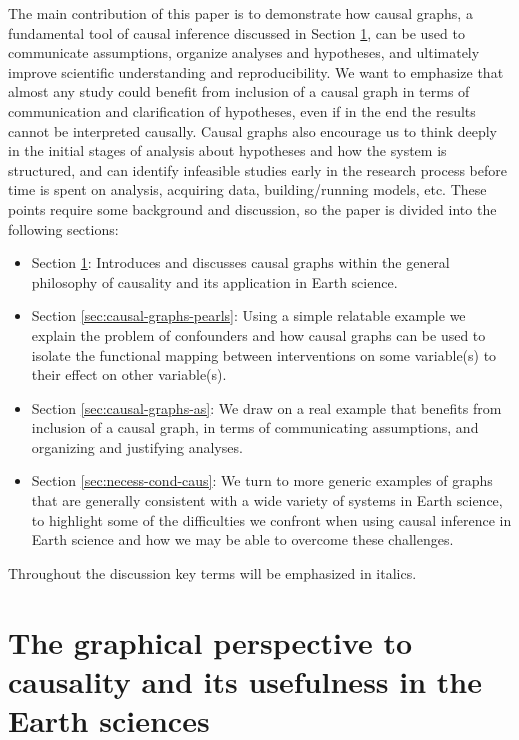 \documentclass[12pt]{article}
\begin{document}
The main contribution of this paper is to demonstrate how causal
graphs, a fundamental tool of causal inference discussed in Section
\ref{sec:what-caus-caus}, can be used to communicate assumptions,
organize analyses and hypotheses, and ultimately improve scientific
understanding and reproducibility. We want to emphasize that almost
any study could benefit from inclusion of a causal graph in terms of
communication and clarification of hypotheses, even if in the end the
results cannot be interpreted causally. Causal graphs also encourage
us to think deeply in the initial stages of analysis about hypotheses
and how the system is structured, and can identify infeasible studies
early in the research process before time is spent on analysis,
acquiring data, building/running models, etc. These points require
some background and discussion, so the paper is divided into the
following sections:

\begin{itemize}
\item Section \ref{sec:what-caus-caus}: Introduces and discusses
  causal graphs within the general philosophy of causality and its
  application in Earth science.
\item Section \ref{sec:causal-graphs-pearls}: Using a simple relatable
  example we explain the problem of confounders and how causal graphs
  can be used to isolate the functional mapping between interventions
  on some variable(s) to their effect on other variable(s).
\item Section \ref{sec:causal-graphs-as}: We draw on a real example
  that benefits from inclusion of a causal graph, in terms of
  communicating assumptions, and organizing and justifying analyses.
\item Section \ref{sec:necess-cond-caus}: We turn to more generic
  examples of graphs that are generally consistent with a wide variety
  of systems in Earth science, to highlight some of the difficulties
  we confront when using causal inference in Earth science and how we
  may be able to overcome these challenges.
\end{itemize}

Throughout the discussion key terms will be emphasized in italics.

\section{The graphical
  perspective to causality and its usefulness in the Earth
  sciences}\label{sec:what-caus-caus}
\end{document}
